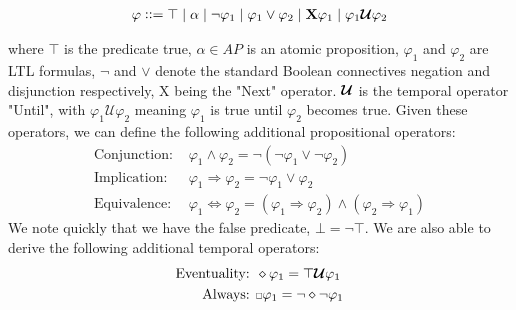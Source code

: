 \begin{align*}
    \varphi ::= \top \hspace{0.1cm} |\hspace{0.1cm} \alpha \hspace{0.1cm} | \hspace{0.1cm} \neg \varphi_1 \hspace{0.1cm} | \hspace{0.1cm} \varphi_1  \lor \varphi_2 \hspace{0.1cm} | \hspace{0.1cm} \textbf{X} \varphi_1 \hspace{0.1cm} | \hspace{0.1cm} \varphi_1 \bm{\mathcal{U}} \varphi_2
\end{align*}

where $\top$ is the predicate true, $\alpha \in AP$ is an atomic proposition, $\varphi_1$ and $\varphi_2$ are LTL formulas, $\neg$ and $\lor$ denote the standard Boolean connectives negation and disjunction respectively, X being the "Next" operator. $\bm{\mathcal{U}}$ is the temporal operator "Until", with $\varphi_1 \mathcal{U} \varphi_2$ meaning $\varphi_1$ is true until $\varphi_2$ becomes true. Given these operators, we can define the following additional propositional operators:
\begin{align*}
    \text{Conjunction: }&  \varphi_1  \land \varphi_2 = \neg(\neg \varphi_1 \lor \neg \varphi_2) \\
    \text{Implication: }& \varphi_1 \Rightarrow \varphi_2 = \neg \varphi_1 \lor \varphi_2 \\
    \text{Equivalence: }& \varphi_1 \Leftrightarrow \varphi_2 = (\varphi_1 \Rightarrow \varphi_2) \land (\varphi_2 \Rightarrow \varphi_1)
\end{align*}
We note quickly that we have the false predicate, $\bot = \neg \top$.
We are also able to derive the following additional temporal operators:
\begin{align*}
    \text{Eventuality: }& \diamond \varphi_1 = \top \U \varphi_1 \\
    \text{Always: }& \ssquare \varphi_1 = \neg \diamond \neg \varphi_1
\end{align*}

